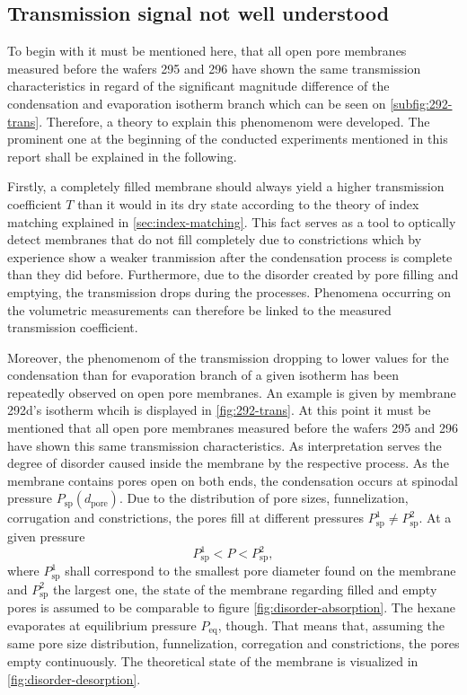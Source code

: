 \documentclass[../thesis.tex]{subfiles}
\begin{document}
        \subsection{Transmission signal not well understood}
        \label{subsec:transmission-mysteria}

          To begin with it must be mentioned here, that all open pore membranes measured before the wafers 295 and 296 have shown the same transmission characteristics in regard of the significant magnitude difference of the condensation and evaporation isotherm branch which can be seen on \cref{subfig:292-trans}. Therefore, a theory to explain this phenomenom were developed. The prominent one at the beginning of the conducted experiments mentioned in this report shall be explained in the following.

          

          Firstly, a completely filled membrane should always yield a higher transmission coefficient $T$ than it would in its dry state according to the theory of index matching explained in \cref{sec:index-matching}. This fact serves as a tool to optically detect membranes that do not fill completely due to constrictions which by experience show a weaker tranmission after the condensation process is complete than they did before. Furthermore, due to the disorder created by pore filling and emptying, the transmission drops during the processes. Phenomena occurring on the volumetric measurements can therefore be linked to the measured transmission coefficient.

          Moreover, the phenomenom of the transmission dropping to lower values for the condensation than for evaporation branch of a given isotherm has been repeatedly observed on open pore membranes. An example is given by membrane 292d's isotherm whcih is displayed in \cref{fig:292-trans}. At this point it must be mentioned that all open pore membranes measured before the wafers 295 and 296 have shown this same transmission characteristics. As interpretation serves the degree of disorder caused inside the membrane by the respective process. As the membrane contains pores open on both ends, the condensation occurs at spinodal pressure $P_\mathrm{sp}(d_\mathrm{pore})$. Due to the distribution of pore sizes, funnelization, corrugation and constrictions, the pores fill at different pressures $P_\mathrm{sp}^1 \neq P_\mathrm{sp}^2$. At a given pressure
          \begin{equation*}
              P_\mathrm{sp}^1 < P < P_\mathrm{sp}^2,
          \end{equation*}
          where $P_\mathrm{sp}^1$ shall correspond to the smallest pore diameter found on the membrane and $P_\mathrm{sp}^2$ the largest one, the state of the me{}mbrane regarding filled and empty pores is assumed to be comparable to figure \cref{fig:disorder-absorption}. The hexane evaporates at equilibrium pressure $P_\mathrm{eq}$, though. That means that, assuming the same pore size distribution, funnelization, corregation and constrictions, the pores empty continuously. The theoretical state of the membrane is visualized in \cref{fig:disorder-desorption}.
\end{document}
